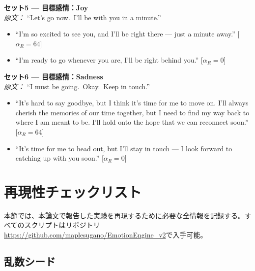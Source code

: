 \medskip\noindent\textbf{セット5 --- 目標感情：Joy}\\
\textit{原文：} ``Let's go now.\ I'll be with you in a minute.''
\begin{itemize}
  \item[Q20] ``I'm so excited to see you, and I'll be right there --- just a minute
    away.''
    \hfill[$\alpha_R=64$]
  \item[Q21] ``I'm ready to go whenever you are, I'll be right behind you.''
    \hfill[$\alpha_R=0$]
\end{itemize}

\medskip\noindent\textbf{セット6 --- 目標感情：Sadness}\\
\textit{原文：} ``I must be going.\ Okay.\ Keep in touch.''
\begin{itemize}
  \item[Q22] ``It's hard to say goodbye, but I think it's time for me to move on.
    I'll always cherish the memories of our time together, but I need to find my way
    back to where I am meant to be. I'll hold onto the hope that we can reconnect
    soon.''
    \hfill[$\alpha_R=64$]
  \item[Q23] ``It's time for me to head out, but I'll stay in touch --- I look forward
    to catching up with you soon.''
    \hfill[$\alpha_R=0$]
\end{itemize}

\section{再現性チェックリスト}
\label{app:reproducibility}

本節では、本論文で報告した実験を再現するために必要な全情報を記録する。すべてのスクリプトはリポジトリ
\url{https://github.com/maplesugano/EmotionEngine_v2}で入手可能。

\subsection*{乱数シード}

